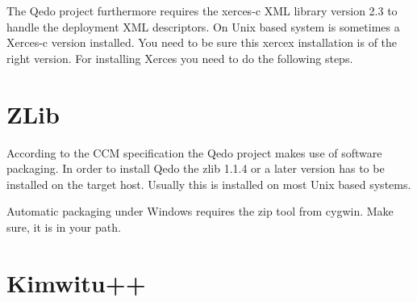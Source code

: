 \documentclass[12pt,a4paper]{report}
\begin{document}
The Qedo project furthermore requires the xerces-c XML library version 2.3 to handle the deployment XML descriptors. On Unix based system is sometimes a Xerces-c version installed. You need to be sure this xercex installation is of the right version. For installing Xerces you need to do the following steps.


\section{ZLib}
\label{sec:ZLib}


According to the CCM specification the Qedo project makes use of software packaging. In order to install Qedo the zlib 1.1.4 or a later version has to be installed on the target host. Usually this is installed on most Unix based systems.


Automatic packaging under Windows requires the zip tool from cygwin. Make sure, it is in your path.


\section{Kimwitu++}
\label{sec:Kimwitu}
\end{document}
